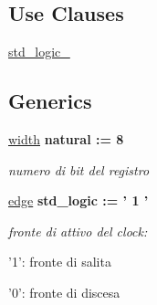 \subsection*{Use Clauses}
 \begin{DoxyCompactItemize}
\item 
\hyperlink{group___generic_buffer_gacd03516902501cd1c7296a98e22c6fcb}{std\+\_\+logic\+\_}   
\end{DoxyCompactItemize}
\subsection*{Generics}
 \begin{DoxyCompactItemize}
\item 
\hyperlink{group___generic_buffer_gae47d961480346c1d82439a66505e6e7d}{width} {\bfseries {\bfseries \textcolor{vhdlchar}{natural}\textcolor{vhdlchar}{ }\textcolor{vhdlchar}{ }\textcolor{vhdlchar}{\+:}\textcolor{vhdlchar}{=}\textcolor{vhdlchar}{ }\textcolor{vhdlchar}{ } \textcolor{vhdldigit}{8} \textcolor{vhdlchar}{ }}}
\begin{DoxyCompactList}\small\item\em numero di bit del registro \end{DoxyCompactList}\item 
\hyperlink{group___generic_buffer_ga9079dbf8b7827a9cf522497d56994375}{edge} {\bfseries {\bfseries \textcolor{vhdlchar}{std\+\_\+logic}\textcolor{vhdlchar}{ }\textcolor{vhdlchar}{ }\textcolor{vhdlchar}{\+:}\textcolor{vhdlchar}{=}\textcolor{vhdlchar}{ }\textcolor{vhdlchar}{ }\textcolor{vhdlchar}{'}\textcolor{vhdlchar}{ } \textcolor{vhdldigit}{1} \textcolor{vhdlchar}{ }\textcolor{vhdlchar}{'}\textcolor{vhdlchar}{ }}}
\begin{DoxyCompactList}\small\item\em fronte di attivo del clock\+:
\begin{DoxyItemize}
\item '1'\+: fronte di salita
\item '0'\+: fronte di discesa 
\end{DoxyItemize}\end{DoxyCompactList}\end{DoxyCompactItemize}
